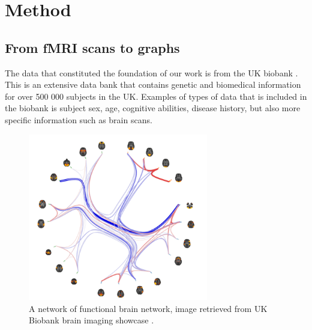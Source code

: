 \chapter{Method}

\section{From fMRI scans to graphs}
The data that constituted the foundation of our work is from the UK biobank \cite{}. This is an extensive data bank that contains genetic and biomedical information for over 500 000 subjects in the UK. Examples of types of data that is included in the biobank is subject sex, age, cognitive abilities, disease history, but also more specific information such as brain scans. 

\begin{figure}[H]
    \centering
    \includegraphics[width=0.7\textwidth]{chapters/images_methods/fmri_network.PNG}
    \caption{A network of functional brain network, image retrieved from UK Biobank brain imaging showcase  \cite{ukbiobank_brain_imaging}.}
    \label{fig:fmri_network}
\end{figure}

